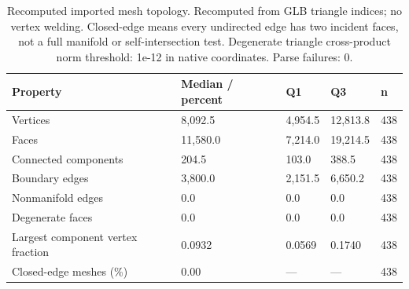 \begin{table}[t]
\centering\small
\caption{Recomputed imported mesh topology. Recomputed from GLB triangle indices; no vertex welding. Closed-edge means every undirected edge has two incident faces, not a full manifold or self-intersection test. Degenerate triangle cross-product norm threshold: 1e-12 in native coordinates. Parse failures: 0.}
\begin{tabular}{lllll}
\toprule
Property & Median / percent & Q1 & Q3 & n \\
\midrule
Vertices & 8,092.5 & 4,954.5 & 12,813.8 & 438 \\
Faces & 11,580.0 & 7,214.0 & 19,214.5 & 438 \\
Connected components & 204.5 & 103.0 & 388.5 & 438 \\
Boundary edges & 3,800.0 & 2,151.5 & 6,650.2 & 438 \\
Nonmanifold edges & 0.0 & 0.0 & 0.0 & 438 \\
Degenerate faces & 0.0 & 0.0 & 0.0 & 438 \\
Largest component vertex fraction & 0.0932 & 0.0569 & 0.1740 & 438 \\
Closed-edge meshes (\%) & 0.00 & — & — & 438 \\
\bottomrule
\end{tabular}
\end{table}
